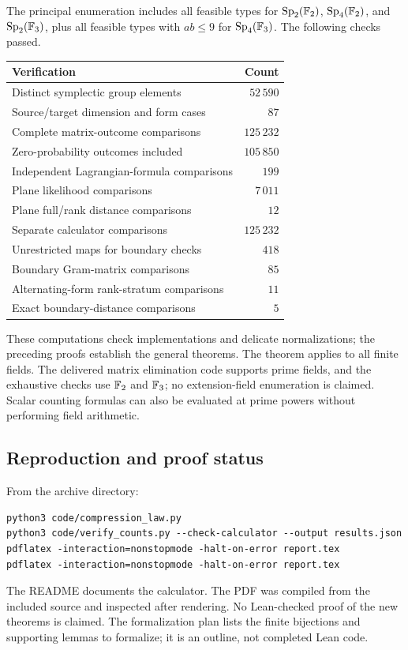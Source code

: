 The principal enumeration includes all feasible types for
$\operatorname{Sp}_2(\mathbb F_2)$, $\operatorname{Sp}_4(\mathbb F_2)$, and $\operatorname{Sp}_2(\mathbb F_3)$, plus all feasible
types with $ab\le9$ for $\operatorname{Sp}_4(\mathbb F_3)$. The following checks passed.
\begin{center}
\begin{tabular}{lr}
\toprule
Verification & Count\\
\midrule
Distinct symplectic group elements & $52\,590$\\
Source/target dimension and form cases & $87$\\
Complete matrix-outcome comparisons & $125\,232$\\
Zero-probability outcomes included & $105\,850$\\
Independent Lagrangian-formula comparisons & $199$\\
Plane likelihood comparisons & $7\,011$\\
Plane full/rank distance comparisons & $12$\\
Separate calculator comparisons & $125\,232$\\
Unrestricted maps for boundary checks & $418$\\
Boundary Gram-matrix comparisons & $85$\\
Alternating-form rank-stratum comparisons & $11$\\
Exact boundary-distance comparisons & $5$\\
\bottomrule
\end{tabular}
\end{center}

These computations check implementations and delicate normalizations;
the preceding proofs establish the general theorems.
The theorem applies to all finite fields. The delivered matrix
elimination code supports prime fields, and the exhaustive checks
use $\mathbb F_2$ and $\mathbb F_3$; no extension-field enumeration is claimed.
Scalar counting formulas can also be evaluated at prime powers
without performing field arithmetic.

\subsection{Reproduction and proof status}

From the archive directory:
\begin{verbatim}
python3 code/compression_law.py
python3 code/verify_counts.py --check-calculator --output results.json
pdflatex -interaction=nonstopmode -halt-on-error report.tex
pdflatex -interaction=nonstopmode -halt-on-error report.tex
\end{verbatim}
The README documents the calculator. The PDF was compiled from the
included source and inspected after rendering.
No Lean-checked proof of the new theorems is claimed. The
formalization plan lists the finite bijections and supporting lemmas
to formalize; it is an outline, not completed Lean code.

